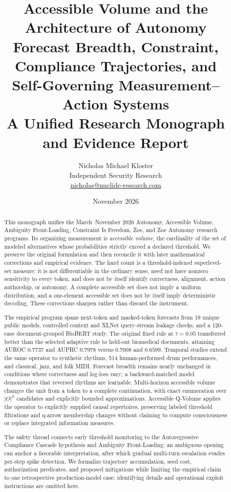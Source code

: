 \documentclass[11pt,letterpaper]{article}
\title{\textbf{Accessible Volume and the Architecture of Autonomy}\\[7pt]
\Large Forecast Breadth, Constraint, Compliance Trajectories, and\\Self-Governing Measurement--Action Systems\\[7pt]
\large A Unified Research Monograph and Evidence Report}
\author{Nicholas Michael Kloster\\
Independent Security Research\\
\href{mailto:nicholas@nuclide-research.com}{nicholas@nuclide-research.com}}
\date{November 2026}
\theoremstyle{definition}
\theoremstyle{plain}
\theoremstyle{remark}
\begin{document}
\maketitle
\thispagestyle{fancy}

\begin{abstract}
\noindent
This monograph unifies the March--November 2026 Autonomy, Accessible Volume, Ambiguity Front-Loading, Constraint Is Freedom, Zoe, and Zoe Autonomy research programs. Its organizing measurement is \emph{accessible volume}, the cardinality of the set of modeled alternatives whose probabilities strictly exceed a declared threshold. We preserve the original formulation and then reconcile it with later mathematical corrections and empirical evidence. The hard count is a threshold-indexed superlevel-set measure: it is not differentiable in the ordinary sense, need not have nonzero sensitivity to every token, and does not by itself identify correctness, alignment, action authorship, or autonomy. A complete accessible set does not imply a uniform distribution, and a one-element accessible set does not by itself imply deterministic decoding. These corrections sharpen rather than discard the instrument.

The empirical program spans next-token and masked-token forecasts from 19 unique public models, controlled context and XLNet query-stream leakage checks, and a 120-case document-grouped BioBERT study. The original fixed rule at $\tau=0.05$ transferred better than the selected adaptive rule to held-out biomedical documents, attaining AUROC $0.7737$ and AUPRC $0.7978$ versus $0.7008$ and $0.6599$. Temporal studies extend the same operator to synthetic rhythms, 514 human-performed drum performances, and classical, jazz, and folk MIDI. Forecast breadth remains nearly unchanged in conditions where correctness and log-loss vary; a backward-matched model demonstrates that reversed rhythms are learnable. Multi-horizon accessible volume changes the unit from a token to a complete continuation, with exact enumeration over $|O|^h$ candidates and explicitly bounded approximations. Accessible Q-Volume applies the operator to explicitly supplied causal repertoires, preserving labeled threshold filtrations and q-arrow membership changes without claiming to compute consciousness or replace integrated information measures.

The safety thread connects early threshold monitoring to the Autoregressive Compliance Cascade hypothesis and Ambiguity Front-Loading: an ambiguous opening can anchor a favorable interpretation, after which gradual multi-turn escalation evades per-step spike detection. We formalize trajectory accumulation, seed cost, authorization predicates, and proposed mitigations while limiting the empirical claim to one retrospective production-model case; identifying details and operational exploit instructions are omitted here.


\end{abstract}
\end{document}

